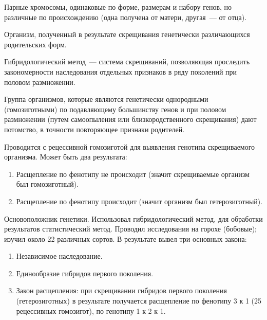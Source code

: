 \documentclass[12pt]{article}
\begin{document}
	\begin{definition}
		Парные хромосомы, одинаковые по форме, размерам и набору генов, но различные по происхождению (одна получена от матери, другая~--- от отца).
	\end{definition}
	
	\begin{definition}[Гибрид]
		Организм, полученный в результате скрещивания генетически различающихся родительских форм.
	\end{definition}
	
	\begin{definition}
		Гибридологический метод~--- система скрещиваний, позволяющая проследить закономерности наследования отдельных признаков в ряду поколений при половом размножении.
	\end{definition}
	
	\begin{definition}
		Группа организмов, которые являются генетически однородными (гомозиготными) по подавляющему большинству генов и при половом размножении (путем самоопыления или близкородственного скрещивания) дают потомство, в точности повторяющее признаки родителей.
	\end{definition}
	
	\begin{definition}
		Проводится с рецессивной гомозиготой для выявления генотипа скрещиваемого организма. Может быть два результата:
		
		\begin{enumerate}
			\item Расщепление по фенотипу не происходит (значит скрещиваемые организм был гомозиготный).
			
			\item Расщепление по фенотипу происходит (значит организм был гетерозиготный).
		\end{enumerate}
	\end{definition}
	
	\begin{person}
		Основоположник генетики. Использовал гибридологический метод, для обработки результатов статистический метод. Проводил исследования на горохе (бобовые); изучил около 22 различных сортов. В результате вывел три основных закона:
		
		\begin{enumerate}
			\item Независимое наследование.
			
			\item Единообразие гибридов первого поколения.
			
			\item Закон расщепления: при скрещивании гибридов первого поколения (гетерозиготных) в результате получается расщепление по фенотипу 3 к 1 (25 рецессивных гомозигот), по генотипу 1 к 2 к 1.
		\end{enumerate}
	\end{person}
	
\end{document}
